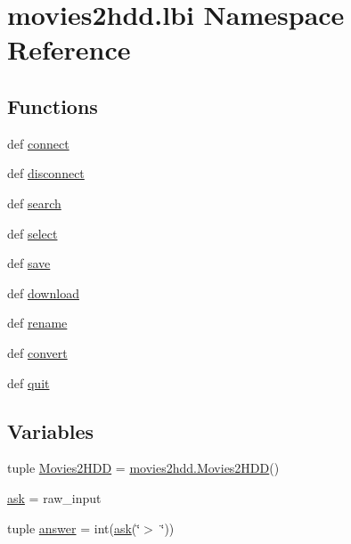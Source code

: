 \hypertarget{namespacemovies2hdd_1_1lbi}{\section{movies2hdd.\-lbi Namespace Reference}
\label{namespacemovies2hdd_1_1lbi}
}
\subsection*{Functions}
\begin{DoxyCompactItemize}
\item 
def \hyperlink{namespacemovies2hdd_1_1lbi_aa411fd2536c5b5990b10eefa5013632a}{connect}
\item 
def \hyperlink{namespacemovies2hdd_1_1lbi_af95b673a57b5470449d62aaf07b91cde}{disconnect}
\item 
def \hyperlink{namespacemovies2hdd_1_1lbi_a8a952cc0a80b1f4ab0bb4d1eaf8f1cfd}{search}
\item 
def \hyperlink{namespacemovies2hdd_1_1lbi_a68a02cd4a9f9c827984c06b24947f42a}{select}
\item 
def \hyperlink{namespacemovies2hdd_1_1lbi_a7cffc384bf2cf29f12ea83b2c59800d0}{save}
\item 
def \hyperlink{namespacemovies2hdd_1_1lbi_a613308653e921ffefd9d15bd912d45f6}{download}
\item 
def \hyperlink{namespacemovies2hdd_1_1lbi_a575a370ef89b527cbda766ff0341e3b4}{rename}
\item 
def \hyperlink{namespacemovies2hdd_1_1lbi_af82814dc0312f2a2a8de4672e6f79c6e}{convert}
\item 
def \hyperlink{namespacemovies2hdd_1_1lbi_a57f4964811a71e55d727484d464ea6e2}{quit}
\end{DoxyCompactItemize}
\subsection*{Variables}
\begin{DoxyCompactItemize}
\item 
tuple \hyperlink{namespacemovies2hdd_1_1lbi_a0a37f11b0348a8fcc9af17541471fbd8}{Movies2\-H\-D\-D} = \hyperlink{classmovies2hdd_1_1_movies2_h_d_d}{movies2hdd.\-Movies2\-H\-D\-D}()
\item 
\hyperlink{namespacemovies2hdd_1_1lbi_a4bc534737690c0a51a760418d39e3753}{ask} = raw\-\_\-input
\item 
tuple \hyperlink{namespacemovies2hdd_1_1lbi_ab0bb9564b6047c61086071bdae2ba4ce}{answer} = int(\hyperlink{namespacemovies2hdd_1_1lbi_a4bc534737690c0a51a760418d39e3753}{ask}(\char`\"{}$>$ \char`\"{}))
\end{DoxyCompactItemize}


